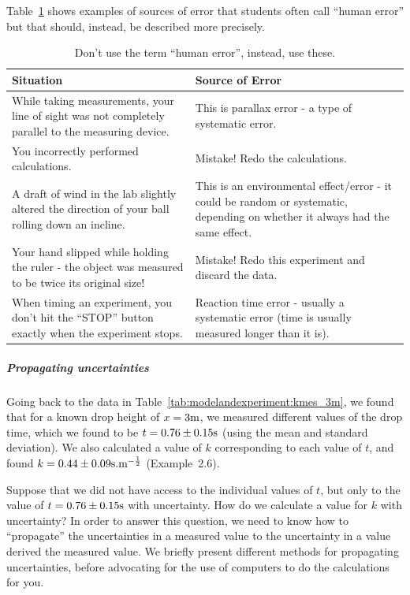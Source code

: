 Table~\ref{tab:modelandexperiment:humanerror} shows examples of sources of error that students often call ``human error'' but that should, instead, be described more precisely.

\begin{table}
\centering
\caption[]{Don't use the term ``human error'', instead, use these.}
\label{tab:modelandexperiment:humanerror}
\begin{tabular}{p{}p{}}
\toprule
\textbf{Situation} & \textbf{Source of Error} \\
\hline
While taking measurements, your line of sight was not completely parallel to the measuring device. & This is parallax error - a type of systematic error. \\
You incorrectly performed calculations. & Mistake! Redo the calculations. \\
A draft of wind in the lab slightly altered the direction of your ball rolling down an incline. & This is an environmental effect/error - it could be random or systematic, depending on whether it always had the same effect. \\
Your hand slipped while holding the ruler - the object was measured to be twice its original size! & Mistake! Redo this experiment and discard the data. \\
When timing an experiment, you don't hit the ``STOP'' button exactly when the experiment stops. & Reaction time error - usually a systematic error (time is usually measured longer than it is). \\
\bottomrule
\end{tabular}
\end{table}

\subparagraph{Propagating uncertainties}

Going back to the data in Table~\ref{tab:modelandexperiment:kmes_3m}, we found that for a known drop height of $x=3 {\rm m}$, we measured different values of the drop time, which we found to be $t=0.76 \pm 0.15 {\rm s}$ (using the mean and standard deviation). We also calculated a value of $k$ corresponding to each value of $t$, and found $k=0.44 \pm 0.09{\rm s.m^{ -\frac{1}{2}}}$ (Example~2.6).

Suppose that we did not have access to the individual values of $t$, but only to the value of $t=0.76 \pm 0.15 {\rm s}$ with uncertainty. How do we calculate a value for $k$ with uncertainty? In order to answer this question, we need to know how to ``propagate'' the uncertainties in a measured value to the uncertainty in a value derived the measured value. We briefly present different methods for propagating uncertainties, before advocating for the use of computers to do the calculations for you.

